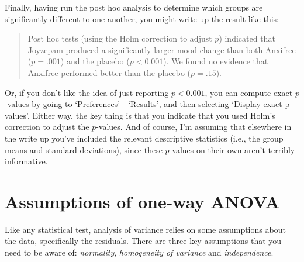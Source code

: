 
Finally, having run the post hoc analysis to determine which groups are significantly different to one another, you might write up the result like this:
\begin{quote}
Post hoc tests (using the Holm correction to adjust $p$) indicated that Joyzepam produced a significantly larger mood change than both Anxifree ($p = .001$) and the placebo ($p < 0.001$). We found no evidence that Anxifree performed better than the placebo ($p = .15$).
\end{quote}
Or, if you don't like the idea of just reporting $p<0.001$, you can compute exact $p$-values by going to `Preferences' - `Results', and then selecting `Display exact p-values'. Either way, the key thing is that you indicate that you used Holm's correction to adjust the $p$-values. And of course, I'm assuming that elsewhere in the write up you've included the relevant descriptive statistics (i.e., the group means and standard deviations), since these $p$-values on their own aren't terribly informative. 


\section{Assumptions of one-way ANOVA \label{sec:anovaassumptions}}

Like any statistical test, analysis of variance relies on some assumptions about the data, specifically the residuals. There are three key assumptions that you need to be aware of: {\it normality}, {\it homogeneity of variance} and {\it independence}. 


